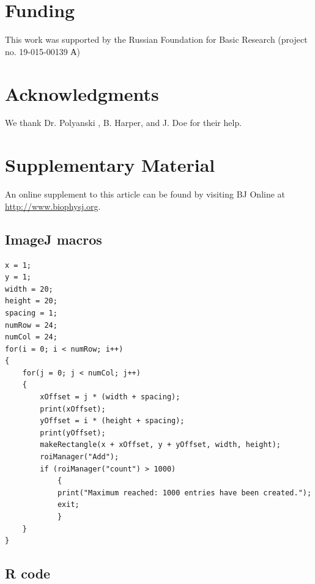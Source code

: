 \documentclass{biophys-new}
\begin{document}
\section*{Funding}
This work was supported by the Russian Foundation for Basic Research (project no. 19-015-00139 А)

\section*{Acknowledgments}
We thank Dr. Polyanski , B. Harper, and J. Doe for their help.




\section*{Supplementary Material}
An online supplement to this article can be found by visiting BJ Online at \url{http://www.biophysj.org}.

\subsection*{ImageJ macros}\label{macros}
\begin{lstlisting}
x = 1;
y = 1;
width = 20;
height = 20;
spacing = 1;
numRow = 24;
numCol = 24;
for(i = 0; i < numRow; i++)
{
	for(j = 0; j < numCol; j++)
	{
		xOffset = j * (width + spacing);
		print(xOffset);
		yOffset = i * (height + spacing);
		print(yOffset);
		makeRectangle(x + xOffset, y + yOffset, width, height);
		roiManager("Add");
		if (roiManager("count") > 1000)
			{
			print("Maximum reached: 1000 entries have been created.");
			exit;
			}
	}
}
\end{lstlisting}

\subsection*{R code}
\end{document}
